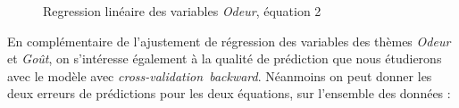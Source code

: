 \documentclass[a4paper,french,10pt]{article}
\begin{document}
\begin{figure}[htp]
{	}%
	\hfill%
	\caption{Regression linéaire des variables \textit{Odeur}, équation 2}
\end{figure}

En complémentaire de l'ajustement de régression des variables des thèmes \textit{Odeur} et \textit{Goût}, on s'intéresse également à la qualité de prédiction que nous étudierons avec le modèle avec \textit{cross-validation~backward}. Néanmoins on peut donner les deux erreurs de prédictions pour les deux équations, sur l'ensemble des données : 


\begin{figure}[htp] 
	\centering
	\hfill%
\end{figure}
\end{document}
